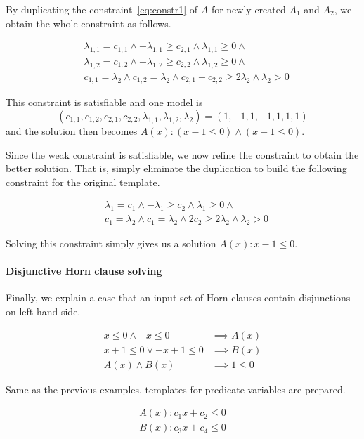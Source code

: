 \documentclass[master,final,12pt]{iscs-thesis}
\begin{document}
By duplicating the constraint~\ref{eq:constr1} of $A$ for newly
created $A_1$ and $A_2$, we obtain the whole constraint as follows.

\begin{align*}
& \lambda_{1,1} = c_{1,1} \wedge - \lambda_{1,1} \geq c_{2,1} \wedge \lambda_{1,1} \geq 0 \wedge \\
& \lambda_{1,2} = c_{1,2} \wedge - \lambda_{1,2} \geq c_{2,2} \wedge \lambda_{1,2} \geq 0 \wedge \\
& c_{1,1} = \lambda_2 \wedge c_{1,2} = \lambda_2 \wedge c_{2,1} + c_{2,2} \geq 2 \lambda_2 \wedge \lambda_2 > 0
\end{align*}

This constraint is satisfiable and one model is
\[ ( c_{1,1}, c_{1,2}, c_{2,1}, c_{2,2}, \lambda_{1,1}, \lambda_{1,2}, \lambda_2 ) =
( 1, -1, 1, -1, 1, 1, 1 ) \] and the solution then becomes
$A(x) : (x -1 \leq 0) \wedge (x -1 \leq 0)$.

Since the weak constraint is satisfiable, we now refine the constraint
to obtain the better solution.  That is, simply eliminate the
duplication to build the following constraint for the original
template.

\begin{align*}
& \lambda_1 = c_1 \wedge - \lambda_1 \geq c_2 \wedge \lambda_1 \geq 0 \wedge \\
& c_1 = \lambda_2 \wedge c_1 = \lambda_2 \wedge 2 c_2 \geq 2 \lambda_2 \wedge \lambda_2 > 0
\end{align*}

Solving this constraint simply gives us a solution $A(x) : x -1 \leq 0$.

\paragraph {Disjunctive Horn clause solving}
Finally, we explain a case that an input set of Horn clauses contain
disjunctions on left-hand side.

\begin{align*}
x \leq 0 \wedge -x \leq 0 & \implies A(x) \\
x+1 \leq 0 \vee -x+1 \leq 0 & \implies B(x) \\
A(x) \wedge B(x) & \implies 1 \leq 0
\end{align*}

Same as the previous examples, templates for predicate variables are
prepared.

\begin{align*}
A(x) : c_1 x + c_2 \leq 0 \\ B(x) : c_3 x + c_4 \leq 0
\end{align*}
\end{document}
